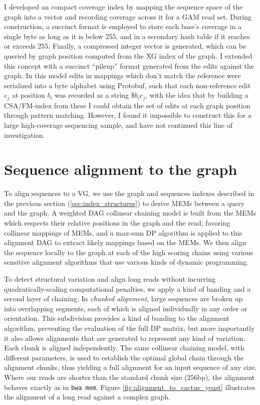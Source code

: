 I developed an compact coverage index by mapping the sequence space of the graph into a vector and recording coverage across it for a GAM read set.
During construction, a succinct format is employed to store each base's coverage in a single byte as long as it is below 255, and in a secondary hash table if it reaches or exceeds 255.
Finally, a compressed integer vector is generated, which can be queried by graph position computed from the XG index of the graph.
I extended this concept with a succinct ``pileup'' format \cite{li2009sequence} generated from the edits against the graph.
In this model edits in mappings which don't match the reference were serialized into a byte alphabet using Protobuf, such that each non-reference edit $e_j$ at position $b_i$ was recorded as a string $\$b_i e_j$, with the idea that by building a CSA/FM-index from these I could obtain the set of edits at each graph position through pattern matching.
However, I found it impossible to construct this for a large high-coverage sequencing sample, and have not continued this line of investigation.

\section{Sequence alignment to the graph}
To align sequences to a VG, we use the graph and sequences indexes described in the previous section (\ref{sec:index_structures}) to derive MEMs between a query and the graph.
A weighted DAG collinear chaining model is built from the MEMs which respects their relative positions in the graph and the read, favoring collinear mappings of MEMs, and a max-sum DP algorithm is applied to this alignment DAG to extract likely mappings based on the MEMs.
We then align the sequence locally to the graph at each of the high scoring chains using various sensitive alignment algorithms that use various kinds of dynamic programming.

To detect structural variation and align long reads without incurring quadratically-scaling computational penalties, we apply a kind of banding and a second layer of chaining.
In \emph{chunked alignment}, large sequences are broken up into overlapping segments, each of which is aligned individually in any order or orientation.
This subdivision provides a kind of banding to the alignment algorithm, preventing the evaluation of the full DP matrix, but more importantly it also allows alignments that are generated to represent any kind of variation.
Each chunk is aligned independently.
The same collinear chaining model, with different parameters, is used to establish the optimal global chain through the alignment chunks, thus yielding a full alignment for an input sequence of any size.
Where our reads are shorter than the standard chunk size (256bp), the alignment behaves exactly as in {\tt bwa mem}.
Figure \ref{fig:alignment_to_cactus_yeast} illustrates the alignment of a long read against a complex graph.

